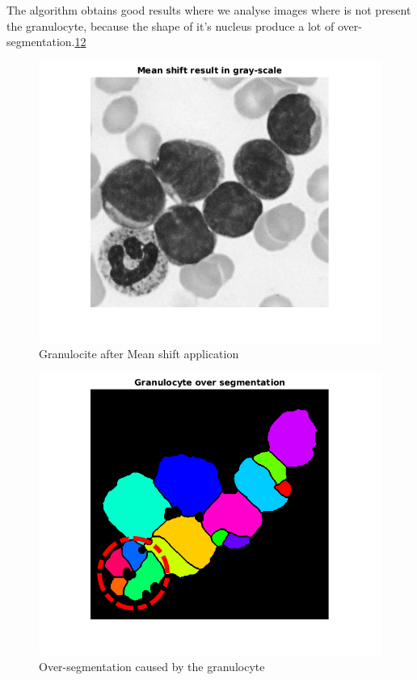 The algorithm obtains good results where we analyse images where is not present the granulocyte, because the shape of it's nucleus produce a lot of over-segmentation.\ref{fig:grangray}\ref{fig:gran}
\begin{figure}
\begin{center}
		\includegraphics[scale=0.5]{img/final/meangran.png}
		\caption{Granulocite after Mean shift application}
		\label{fig:grangray}
\end{center}
\end{figure}
\begin{figure}
\begin{center}
		\includegraphics[scale=0.5]{img/final/fingran.png}
		\caption{Over-segmentation caused by the granulocyte}
		\label{fig:gran}
\end{center}
\end{figure}

